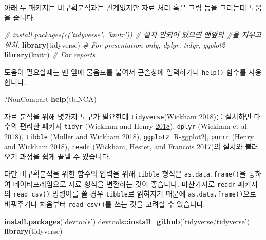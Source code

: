 \documentclass[12pt,]{krantz}
\newenvironment{Shaded}{\begin{snugshade}}{\end{snugshade}}
\newcommand{\KeywordTok}[1]{\textcolor[rgb]{0.13,0.29,0.53}{\textbf{#1}}}
\newcommand{\StringTok}[1]{\textcolor[rgb]{0.31,0.60,0.02}{#1}}
\newcommand{\CommentTok}[1]{\textcolor[rgb]{0.56,0.35,0.01}{\textit{#1}}}
\newcommand{\OperatorTok}[1]{\textcolor[rgb]{0.81,0.36,0.00}{\textbf{#1}}}
\newcommand{\NormalTok}[1]{#1}
\theoremstyle{definition}
\theoremstyle{definition}
\theoremstyle{definition}
\theoremstyle{remark}
\begin{document}
아래 두 패키지는 비구획분석과는 관계없지만 자료 처리 혹은 그림 등을
그리는데 도움을 줍니다.

\begin{Shaded}
\begin{Highlighting}[]
\CommentTok{# install.packages(c('tidyverse', 'knitr')) # 설치 안되어 있으면 맨앞의 #을 지우고 설치.}
\KeywordTok{library}\NormalTok{(tidyverse) }\CommentTok{# For presentation only, dplyr, tidyr, ggplot2}
\KeywordTok{library}\NormalTok{(knitr) }\CommentTok{# For reports}
\end{Highlighting}
\end{Shaded}

도움이 필요할때는 맨 앞에 물음표를 붙여서 콘솔창에 입력하거나
\texttt{help()} 함수를 사용합니다.

\begin{Shaded}
\begin{Highlighting}[]
\NormalTok{?NonCompart}
\KeywordTok{help}\NormalTok{(tblNCA)}
\end{Highlighting}
\end{Shaded}

자료 분석을 위해 몇가지 도구가 필요한데 \texttt{tidyverse}(Wickham
\protect\hyperlink{ref-R-tidyverse}{2018})를 설치하면 다수의 편리한
패키지 \texttt{tidyr} (Wickham and Henry
\protect\hyperlink{ref-R-tidyr}{2018}), \texttt{dplyr} (Wickham et al.
\protect\hyperlink{ref-R-dplyr}{2018}), \texttt{tibble} (Muller and
Wickham \protect\hyperlink{ref-R-tibble}{2018}), \texttt{ggplot2}
{[}R-ggplot2{]}, \texttt{purrr} (Henry and Wickham
\protect\hyperlink{ref-R-purrr}{2018}), \texttt{readr} (Wickham, Hester,
and Francois \protect\hyperlink{ref-R-readr}{2017})의 설치와 불러오기
과정을 쉽게 끝낼 수 있습니다.

다만 비구획분석을 위한 함수의 입력을 위해 \texttt{tibble} 형식은
\texttt{as.data.frame()}을 통하여 데이타프레임으로 자료 형식을 변환하는
것이 좋습니다. 마찬가지로 \texttt{readr} 패키지의 \texttt{read\_csv()}
명령어를 쓸 경우 \texttt{tibble}로 읽혀지기 때문에
\texttt{as.data.frame()}으로 바꿔주거나 처음부터 \texttt{read\_csv()}를
쓰는 것을 고려할 수 있습니다.

\begin{Shaded}
\begin{Highlighting}[]
\KeywordTok{install.packages}\NormalTok{(}\StringTok{'devtools'}\NormalTok{)}
\NormalTok{devtools}\OperatorTok{::}\KeywordTok{install_github}\NormalTok{(}\StringTok{'tidyverse/tidyverse'}\NormalTok{)}
\KeywordTok{library}\NormalTok{(tidyverse)}
\end{Highlighting}
\end{Shaded}
\end{document}
